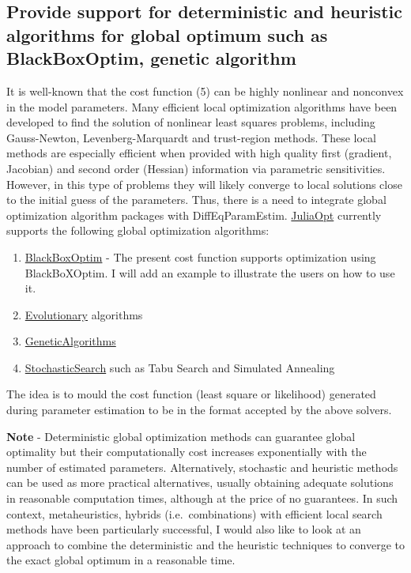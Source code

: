 \documentclass[11pt]{article}
\providecommand{\tightlist}{%
      \setlength{\itemsep}{0pt}\setlength{\parskip}{0pt}}
\begin{document}
    \subsection{Provide support for deterministic and heuristic algorithms
for global optimum such as BlackBoxOptim, genetic
algorithm}\label{provide-support-for-deterministic-and-heuristic-algorithms-for-global-optimum-such-as-blackboxoptim-genetic-algorithm}

It is well-known that the cost function (5) can be highly nonlinear and
nonconvex in the model parameters. Many efficient local optimization
algorithms have been developed to find the solution of nonlinear least
squares problems, including Gauss-Newton, Levenberg-Marquardt and
trust-region methods. These local methods are especially efficient when
provided with high quality first (gradient, Jacobian) and second order
(Hessian) information via parametric sensitivities. However, in this
type of problems they will likely converge to local solutions close to
the initial guess of the parameters. Thus, there is a need to integrate
global optimization algorithm packages with DiffEqParamEstim.
\href{}{JuliaOpt} currently supports the following global optimization
algorithms:

\begin{enumerate}
\def\labelenumi{\arabic{enumi}.}
\tightlist
\item
  \href{https://github.com/robertfeldt/BlackBoxOptim.jl}{BlackBoxOptim}
  - The present cost function supports optimization using BlackBoXOptim.
  I will add an example to illustrate the users on how to use it.
\item
  \href{https://github.com/wildart/Evolutionary.jl}{Evolutionary}
  algorithms
\item
  \href{https://github.com/WestleyArgentum/GeneticAlgorithms.jl}{GeneticAlgorithms}
\item
  \href{https://github.com/phrb/StochasticSearch.jl}{StochasticSearch}
  such as Tabu Search and Simulated Annealing
\end{enumerate}

The idea is to mould the cost function (least square or likelihood)
generated during parameter estimation to be in the format accepted by
the above solvers.

\textbf{Note} - Deterministic global optimization methods can guarantee
global optimality but their computationally cost increases exponentially
with the number of estimated parameters. Alternatively, stochastic and
heuristic methods can be used as more practical alternatives, usually
obtaining adequate solutions in reasonable computation times, although
at the price of no guarantees. In such context, metaheuristics, hybrids
(i.e.~combinations) with efficient local search methods have been
particularly successful, I would also like to look at an approach to
combine the deterministic and the heuristic techniques to converge to
the exact global optimum in a reasonable time.
\end{document}
